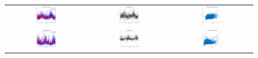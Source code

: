 \begin{figure}[ht!]
  \centering
  \begin{tabular}{ccc}
    \includegraphics[width=0.32\textwidth]{graphs/hybrid/144 hours/mean_fr/actual vs forecast.jpg} &
    \includegraphics[width=0.32\textwidth]{graphs/hybrid/144 hours/mean_fr/residuals.jpg} &
    \includegraphics[width=0.32\textwidth]{graphs/hybrid/144 hours/mean_fr/scatter plot.jpg} \\
    \includegraphics[width=0.32\textwidth]{graphs/hybrid/144 hours/s_wht/actual vs forecast.jpg} &
    \includegraphics[width=0.32\textwidth]{graphs/hybrid/144 hours/s_wht/residuals.jpg} &
    \includegraphics[width=0.32\textwidth]{graphs/hybrid/144 hours/s_wht/scatter plot.jpg} \\

\end{tabular}
\end{figure}
